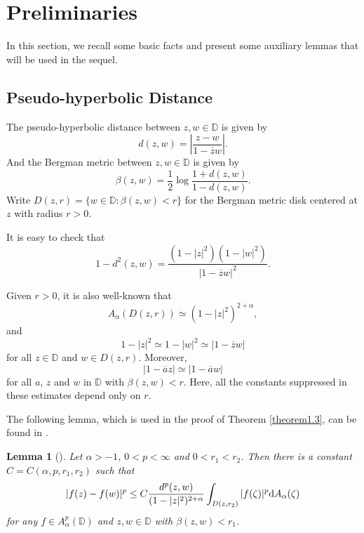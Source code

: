 \documentclass[preprint,12pt,times]{elsarticle}
\newtheorem{lemma}[theorem]{Lemma}
\theoremstyle{definition}
\theoremstyle{remark}
\numberwithin{equation}{section}
\begin{document}
\section{Preliminaries}

In this section, we recall some basic facts and present some auxiliary lemmas that will be used in the sequel.

\subsection{Pseudo-hyperbolic Distance}

The pseudo-hyperbolic distance between $z,w\in\mathbb{D}$ is given by 
\begin{equation*}
d(z,w)=\left|\frac{z-w}{1-\overline{z}w}\right|.
\end{equation*}
And the Bergman metric between $z,w\in\mathbb{D}$ is given by 
\begin{equation*}
\beta(z,w)=\frac{1}{2}\log\frac{1+d(z,w)}{1-d(z,w)}.
\end{equation*}
Write $D(z,r)=\{w\in\mathbb{D}: \beta(z,w)<r\}$ for the Bergman metric disk centered at $z$ with radius $r>0$.

It is easy to check that
\begin{equation}\label{equa2.1}
1-d^2(z,w)=\frac{(1-|z|^2)(1-|w|^2)}{|1-\overline{z}w|^2}.
\end{equation}

Given $r>0$, it is also well-known that
\begin{equation}\label{equa2.2}
A_{\alpha}(D(z,r))\simeq (1-|z|^2)^{2+\alpha},
\end{equation}
and 
\begin{equation}\label{equa2.3}
1-|z|^2\simeq 1-|w|^2\simeq |1-\overline{z}w|
\end{equation}
for all $z\in\mathbb{D}$ and $w\in D(z,r)$. Moreover,
\begin{equation}\label{equa2.4}
|1-\overline{a}z|\simeq |1-\overline{a}w|
\end{equation}
for all $a$, $z$ and $w$ in $\mathbb{D}$ with $\beta(z,w)<r$. Here, all the constants suppressed in these estimates depend only on $r$.


The following lemma, which is used in the proof of Theorem \ref{theorem1.3}, can be found in \cite[Lemma 2.2]{15}.

\begin{lemma}[\cite{15}]\label{lemma2.1}
Let $\alpha>-1$, $0<p<\infty$ and $0<r_1<r_2$. Then there is a constant $C=C(\alpha, p, r_1, r_2)$ such that
\begin{equation*}
|f(z)-f(w)|^p\leq C\frac{d^p(z,w)}{(1-|z|^2)^{2+\alpha}}\int_{D(z,r_2)}|f(\zeta)|^p{\rm d}A_{\alpha}(\zeta)
\end{equation*}
for any $f\in A_{\alpha}^p(\mathbb{D})$ and $z,w\in\mathbb{D}$ with $\beta(z,w)<r_1$.
\end{lemma}
\end{document}
